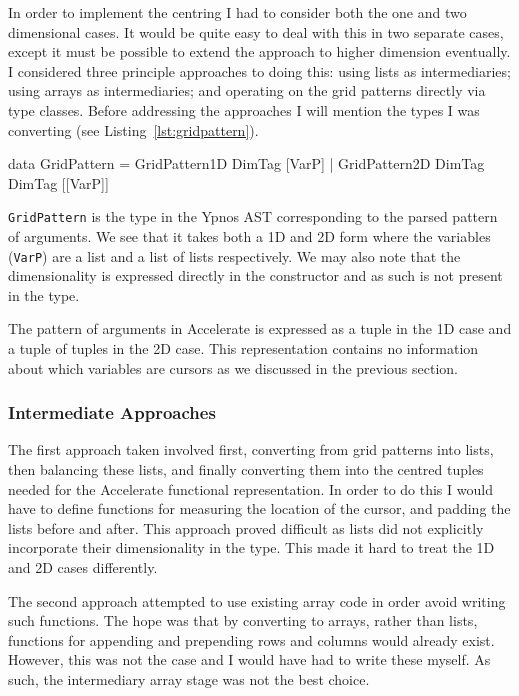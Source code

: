 \documentclass[12pt,a4paper,twoside]{scrbook}
\begin{document}
In order to implement the centring I had to consider both the one and two
dimensional cases. It would be quite easy to deal with this in two separate
cases, except it must be possible to extend the approach to higher dimension
eventually. I considered three principle approaches to doing this: using lists
as intermediaries; using arrays as intermediaries; and operating on the grid
patterns directly via type classes. Before addressing the approaches I will
mention the types I was converting (see Listing~\ref{lst:gridpattern}).

\begin{hflisting}[label={lst:gridpattern}, caption=The data type which stores
  the grid patterns in Ypnos. Notice that the dimensionality is not exposed in
  the type.]
data GridPattern =
    GridPattern1D DimTag [VarP] |
    GridPattern2D DimTag DimTag [[VarP]]
\end{hflisting}

\texttt{GridPattern} is the type in the Ypnos AST corresponding to the
parsed pattern of arguments. We see that it takes both a 1D and 2D form
where the variables (\texttt{VarP}) are a list and a list of lists
respectively. We may also note that the dimensionality is expressed
directly in the constructor and as such is not present in the type.

The pattern of arguments in Accelerate is expressed as a tuple in the 1D case
and a tuple of tuples in the 2D case. This representation contains no
information about which variables are cursors as we discussed in the previous
section.

\subsubsection{Intermediate Approaches}

The first approach taken involved first, converting from grid patterns into
lists, then balancing these lists, and finally converting them into the centred
tuples needed for the Accelerate functional representation. In order to do this
I would have to define functions for measuring the location of the cursor, and
padding the lists before and after. This approach proved difficult as lists did
not explicitly incorporate their dimensionality in the type. This made it hard
to treat the 1D and 2D cases differently.

The second approach attempted to use existing array code in order avoid writing
such functions. The hope was that by converting to arrays, rather than lists,
functions for appending and prepending rows and columns would already
exist. However, this was not the case and I would have had to write these
myself. As such, the intermediary array stage was not the best choice.
\end{document}
